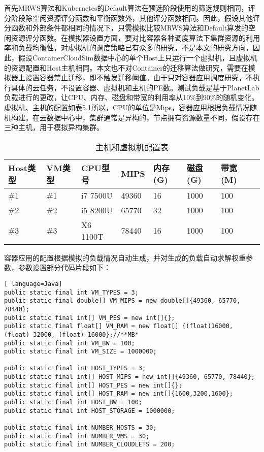 首先MRWS算法和Kubernetes的Default算法在预选阶段使用的筛选规则相同，评分阶段除空闲资源评分函数和平衡函数外，其他评分函数相同。因此，假设其他评分函数和外部条件都相同的情况下，只需模拟比较MRWS算法和Default算发的空闲资源评分函数。在模拟器设置方面，要对比容器各种调度算法下集群资源的利用率和负载均衡性，对虚拟机的调度策略已有众多的研究，不是本文的研究方向，因此，假设ContainerCloudSim数据中心的单个Host上只运行一个虚拟机，且虚拟机的资源配置和Host主机相同。本文也不对Container的迁移算法做研究，需要在模拟器上设置容器禁止迁移，即不触发迁移阈值。由于只对容器应用调度研究，不执行具体的云任务，不设置容器、虚拟机和主机的PE数。测试负载是基于PlanetLab负载进行的更改，让CPU、内存、磁盘和带宽的利用率从10\%到90\%的随机变化。虚拟机、主机的配置如表5.1所以，CPU的单位是Mips，容器应用根据负载情况随机构建。在云数据中心中，集群通常是异构的，节点拥有资源数量不同，假设存在三种主机，用于模拟异构集群。
\begin{table}[H]
	\centering\dawu[1.3]
	\caption{主机和虚拟机配置表}
	\begin{tabular}{|p{1.8cm}<{\centering}|p{1.5cm}<{\centering}|p{2cm}<{\centering}|p{1.5cm}<{\centering}|p{1.5cm}<{\centering}|p{1.5cm}<{\centering}|p{1.5cm}<{\centering}|p{1.5cm}<{\centering}|} \hline
		Host类型 & VM类型 & CPU型号 & MIPS & 内存(G) & 磁盘(G) & 带宽(M) \\ \hline
		\#1 & \#1 & i7 7500U & 49360 & 16 & 1000  & 100 \\ \hline
		\#2 & \#2 & i5 8200U & 65770 & 32 & 1000 & 100 \\ \hline
		\#3 & \#3 & X6 1100T & 78440 & 16 & 1000 & 100 \\ \hline
	\end{tabular}
\end{table}

容器应用的配置根据模拟的负载情况自动生成，并对生成的负载自动求解权重参数，参数设置部分代码片段如下：
\begin{lstlisting}[ language=Java]
public static final int VM_TYPES = 3;
public static final double[] VM_MIPS = new double[]{49360, 65770, 78440};
public static final int[] VM_PES = new int[]{};
public static final float[] VM_RAM = new float[] {(float)16000, (float) 32000, (float) 16000};//**MB*
public static final int VM_BW = 100;
public static final int VM_SIZE = 1000000;

public static final int HOST_TYPES = 3;
public static final int[] HOST_MIPS = new int[]{49360, 65770, 78440};
public static final int[] HOST_PES = new int[]{};
public static final int[] HOST_RAM = new int[]{1600,3200,1600};
public static final int HOST_BW = 100;
public static final int HOST_STORAGE = 1000000;

public static final int NUMBER_HOSTS = 30;
public static final int NUMBER_VMS = 30;
public static final int NUMBER_CLOUDLETS = 200;
\end{lstlisting}

